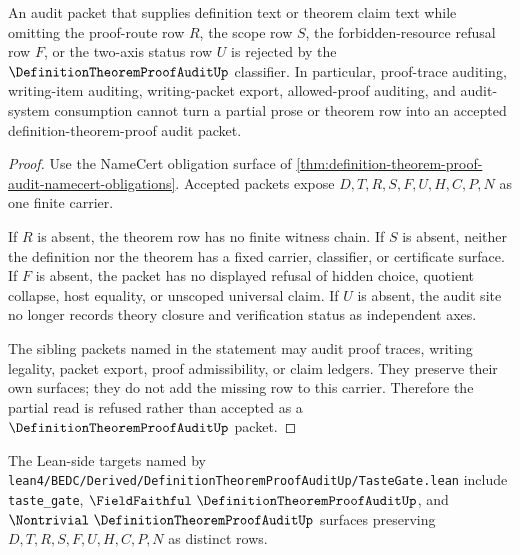 \begin{theorem}
\label{thm:definition-theorem-proof-audit-nonescape}
An audit packet that supplies definition text or theorem claim text while omitting the proof-route row $R$, the scope row $S$, the forbidden-resource refusal row $F$, or the two-axis status row $U$ is rejected by the $\DefinitionTheoremProofAuditUp$ classifier. In particular, proof-trace auditing, writing-item auditing, writing-packet export, allowed-proof auditing, and audit-system consumption cannot turn a partial prose or theorem row into an accepted definition-theorem-proof audit packet.
\end{theorem}
\begin{proof}
Use the NameCert obligation surface of \autoref{thm:definition-theorem-proof-audit-namecert-obligations}. Accepted packets expose $D,T,R,S,F,U,H,C,P,N$ as one finite carrier.

If $R$ is absent, the theorem row has no finite witness chain. If $S$ is absent, neither the definition nor the theorem has a fixed carrier, classifier, or certificate surface. If $F$ is absent, the packet has no displayed refusal of hidden choice, quotient collapse, host equality, or unscoped universal claim. If $U$ is absent, the audit site no longer records theory closure and verification status as independent axes.

The sibling packets named in the statement may audit proof traces, writing legality, packet export, proof admissibility, or claim ledgers. They preserve their own surfaces; they do not add the missing row to this carrier. Therefore the partial read is refused rather than accepted as a $\DefinitionTheoremProofAuditUp$ packet.
\end{proof}



The Lean-side targets named by \texttt{lean4/BEDC/Derived/DefinitionTheoremProofAuditUp/TasteGate.lean} include \texttt{taste\_gate}, $\FieldFaithful\ \DefinitionTheoremProofAuditUp$, and $\Nontrivial\ \DefinitionTheoremProofAuditUp$ surfaces preserving $D,T,R,S,F,U,H,C,P,N$ as distinct rows.

